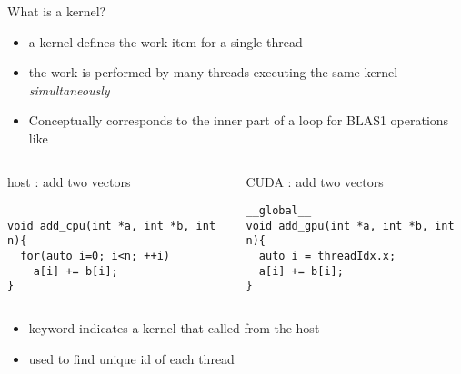 \begin{frame}[fragile]{}
    \begin{info}{What is a kernel?}
    \begin{itemize}
        \item a kernel defines the work item for a single thread
        \item the work is performed by many threads executing the same kernel \emph{simultaneously}
        \item Conceptually corresponds to the inner part of a loop for BLAS1 operations like \axpy
    \end{itemize}
    \end{info}

    \vspace{-10pt}
    \begin{columns}[T]
        \begin{column}{0.5\textwidth}
            \begin{codecolumn}{host : add two vectors}
        \begin{lstlisting}[style=boxcudatiny]

void add_cpu(int *a, int *b, int n){
  for(auto i=0; i<n; ++i)
    a[i] += b[i];
}
        \end{lstlisting}
            \end{codecolumn}
        \end{column}
        \begin{column}{0.5\textwidth}
            \begin{codecolumn}{CUDA : add two vectors}
        \begin{lstlisting}[style=boxcudatiny]
__global__
void add_gpu(int *a, int *b, int n){
  auto i = threadIdx.x;
  a[i] += b[i];
}
        \end{lstlisting}
            \end{codecolumn}
        \end{column}
    \end{columns}

    \vspace{-2pt}
    \begin{info}{}
    \begin{itemize}
        \item {} keyword indicates a kernel that called from the host
        \item {} used to find unique id of each thread
    \end{itemize}
    \end{info}
\end{frame}

